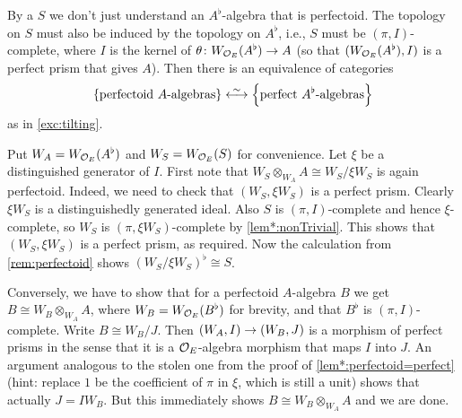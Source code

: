 \documentclass[a4paper, 10pt, oneside, DIV=9, chapterprefix=true, numbers=enddot,bibliography=totoc]{scrbook}
\begin{document}
By a  $S$ we don't just understand an $A^\flat$-algebra that is perfectoid. The topology on $S$ must also be induced by the topology on $A^\flat$, i.e., $S$ must be $(\pi,I)$-complete, where $I$ is the kernel of $\theta\colon W_{\Oo_E}(A^\flat)\morphism A$ (so that $(W_{\mathcal{O}_E}(A^\flat),I)$ is a perfect prism that gives $A$). Then there is an equivalence of categories
\begin{equation*}
	\left\{\text{perfectoid $A$-algebras}\right\}\lrisomorphism \left\{\text{perfect $A^\flat$-algebras}\right\}
\end{equation*}
as in \cref{exc:tilting}.
\begin{proof*}
	Put $W_A=W_{\mathcal{O}_E}(A^\flat)$ and $W_S=W_{\mathcal{O}_E}(S)$ for convenience. Let $\xi$ be a distinguished generator of $I$. First note that $W_S\otimes_{W_A}A\cong W_S/\xi W_S$ is again perfectoid. Indeed, we need to check that $(W_S,\xi W_S)$ is a perfect prism. Clearly $\xi W_S$ is a distinguishedly generated ideal. Also $S$ is $(\pi,I)$-complete and hence $\xi$-complete, so $W_S$ is $(\pi,\xi W_S)$-complete by \cref{lem*:nonTrivial}. This shows that $(W_S,\xi W_S)$ is a perfect prism, as required. Now the calculation from \cref{rem:perfectoid} shows $(W_S/\xi W_S)^\flat\cong S$.
	
	Conversely, we have to show that for a perfectoid $A$-algebra $B$ we get $B\cong W_B\otimes_{W_A} A$, where $W_B=W_{\mathcal{O}_E}(B^\flat)$ for brevity, and that $B^\flat$ is $(\pi,I)$-complete. Write $B\cong W_B/J$. Then  $(W_A,I)\morphism (W_B,J)$ is a morphism of perfect prisms in the sense that it is a $\mathcal{O}_E$-algebra morphism that maps $I$ into $J$. An argument analogous to the stolen one from the proof of \cref{lem*:perfectoid=perfect} (hint: replace $1$ be the coefficient of $\pi$ in $\xi$, which is still a unit) shows that actually $J=IW_B$. But this immediately shows $B\cong W_B\otimes_{W_A}A$ and we are done.
\end{proof*}
\end{document}
